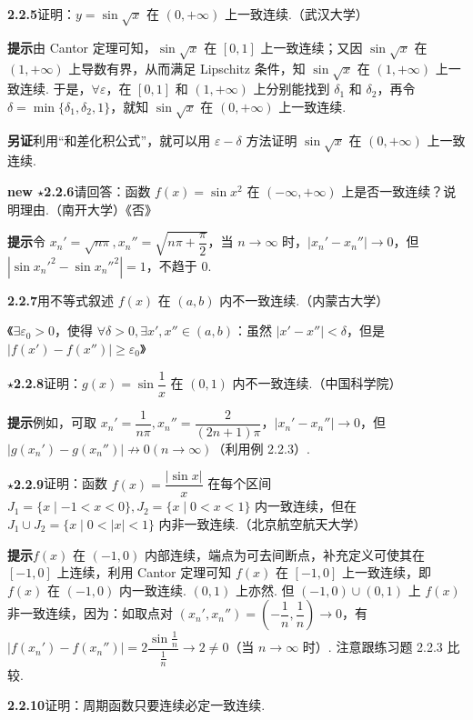 \documentclass[UTF8, 12pt, fontset=fandol, oneside]{ctexart}
\begin{document}
\noindent\textbf{2.2.5}\quad 证明：$y=\sin\sqrt{x}$ 在 $(0,+\infty)$ 上一致连续.（武汉大学）

\noindent\textbf{提示}\quad 由 Cantor 定理可知，$\sin\sqrt{x}$ 在 $[0,1]$ 上一致连续；又因 $\sin\sqrt{x}$ 在 $(1,+\infty)$ 上导数有界，从而满足 Lipschitz 条件，知 $\sin\sqrt{x}$ 在 $(1,+\infty)$ 上一致连续. 于是，$\forall\varepsilon$，在 $[0,1]$ 和 $(1,+\infty)$ 上分别能找到 $\delta_1$ 和 $\delta_2$，再令 $\delta=\min\{\delta_1,\delta_2,1\}$，就知 $\sin\sqrt{x}$ 在 $(0,+\infty)$ 上一致连续.

\noindent\textbf{另证}\quad 利用“和差化积公式”，就可以用 $\varepsilon-\delta$ 方法证明 $\sin\sqrt{x}$ 在 $(0,+\infty)$ 上一致连续.

\noindent\textbf{new $\star$2.2.6}\quad 请回答：函数 $f(x)=\sin x^2$ 在 $(-\infty,+\infty)$ 上是否一致连续？说明理由.（南开大学）\hfill《否》

\noindent\textbf{提示}\quad 令 $x_n'=\sqrt{n\pi},x_n''=\sqrt{n\pi+\dfrac\pi2}$，当 $n\to\infty$ 时，$|x_n'-x_n''|\to0$，但 $|\sin x_n'^2-\sin x_n''^2|=1$，不趋于 0.

\noindent\textbf{2.2.7}\quad 用不等式叙述 $f(x)$ 在 $(a,b)$ 内不一致连续.（内蒙古大学）

《$\exists\varepsilon_0>0$，使得 $\forall\delta>0,\exists x',x''\in(a,b)$：虽然 $|x'-x''|<\delta$，但是 $|f(x')-f(x'')|\ge\varepsilon_0$》

\noindent\textbf{$\star$2.2.8}\quad 证明：$g(x)=\sin\dfrac1x$ 在 $(0,1)$ 内不一致连续.（中国科学院）

\noindent\textbf{提示}\quad 例如，可取 $x_n'=\dfrac1{n\pi},x_n''=\dfrac2{(2n+1)\pi}$，$|x_n'-x_n''|\to0$，但 $|g(x_n')-g(x_n'')|\not\to0(n\to\infty)$（利用例 2.2.3）.

\noindent\textbf{$\star$2.2.9}\quad 证明：函数 $f(x)=\dfrac{|\sin x|}{x}$ 在每个区间 $J_1=\{x\mid -1<x<0\},J_2=\{x\mid0<x<1\}$ 内一致连续，但在 $J_1\cup J_2=\{x\mid0<|x|<1\}$ 内非一致连续.（北京航空航天大学）

\noindent\textbf{提示}\quad $f(x)$ 在 $(-1,0)$ 内部连续，端点为可去间断点，补充定义可使其在 $[-1,0]$ 上连续，利用 Cantor 定理可知 $f(x)$ 在 $[-1,0]$ 上一致连续，即 $f(x)$ 在 $(-1,0)$ 内一致连续. $(0,1)$ 上亦然. 但 $(-1,0)\cup(0,1)$ 上 $f(x)$ 非一致连续，因为：如取点对 $(x_n',x_n'')=\left(-\dfrac1n,\dfrac1n\right)\to0$，有 $|f(x_n')-f(x_n'')|=2\dfrac{\sin\frac1n}{\frac1n}\to2\ne0$（当 $n\to\infty$ 时）. 注意跟练习题 2.2.3 比较.

\noindent\textbf{2.2.10}\quad 证明：周期函数只要连续必定一致连续.
\end{document}
